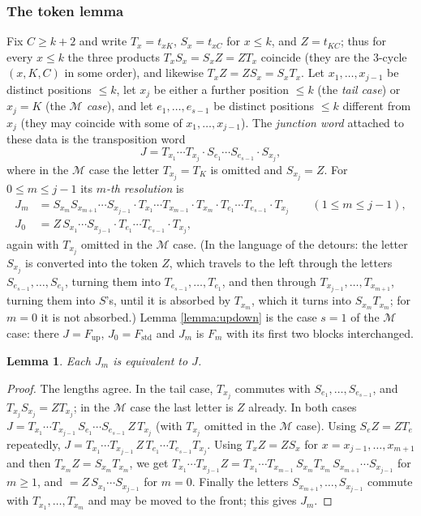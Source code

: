\documentclass{amsart}
\newtheorem{lemma}{Lemma}[section]
\theoremstyle{definition}
\theoremstyle{remark}
\numberwithin{equation}{section}
\begin{document}
\subsubsection*{The token lemma}
Fix $C\geq k+2$ and write $T_x=t_{xK}$, $S_x=t_{xC}$ for $x\leq k$, and $Z=t_{KC}$; thus for every $x\leq k$ the three products $T_xS_x=S_xZ=ZT_x$ coincide (they are the $3$-cycle $(x,K,C)$ in some order), and likewise $T_xZ=ZS_x=S_xT_x$. Let $x_1,\ldots,x_{j-1}$ be distinct positions $\leq k$, let $x_j$ be either a further position $\leq k$ (the \emph{tail case}) or $x_j=K$ (the \emph{$\mathcal M$ case}), and let $e_1,\ldots,e_{s-1}$ be distinct positions $\leq k$ different from $x_j$ (they may coincide with some of $x_1,\ldots,x_{j-1}$). The \emph{junction word} attached to these data is the transposition word
$$J=T_{x_1}\cdots T_{x_j}\cdot S_{e_1}\cdots S_{e_{s-1}}\cdot S_{x_j},$$
where in the $\mathcal M$ case the letter $T_{x_j}=T_K$ is omitted and $S_{x_j}=Z$. For $0\leq m\leq j-1$ its \emph{$m$-th resolution} is
\begin{align*}
J_m&=S_{x_m}S_{x_{m+1}}\cdots S_{x_{j-1}}\cdot T_{x_1}\cdots T_{x_{m-1}}\cdot T_{x_m}\cdot T_{e_1}\cdots T_{e_{s-1}}\cdot T_{x_j}\qquad(1\leq m\leq j-1),\\
J_0&=Z\,S_{x_1}\cdots S_{x_{j-1}}\cdot T_{e_1}\cdots T_{e_{s-1}}\cdot T_{x_j},
\end{align*}
again with $T_{x_j}$ omitted in the $\mathcal M$ case. (In the language of the detours: the letter $S_{x_j}$ is converted into the token $Z$, which travels to the left through the letters $S_{e_{s-1}},\ldots,S_{e_1}$, turning them into $T_{e_{s-1}},\ldots,T_{e_1}$, and then through $T_{x_{j-1}},\ldots,T_{x_{m+1}}$, turning them into $S$'s, until it is absorbed by $T_{x_m}$, which it turns into $S_{x_m}T_{x_m}$; for $m=0$ it is not absorbed.) Lemma \ref{lemma:updown} is the case $s=1$ of the $\mathcal M$ case: there $J=F_{\mathrm{up}}$, $J_0=F_{\mathrm{std}}$ and $J_m$ is $F_m$ with its first two blocks interchanged.

\begin{lemma} \label{lemma:resolutionproduct}
Each $J_m$ is equivalent to $J$.
\end{lemma}
\begin{proof}
The lengths agree. In the tail case, $T_{x_j}$ commutes with $S_{e_1},\ldots,S_{e_{s-1}}$, and $T_{x_j}S_{x_j}=ZT_{x_j}$; in the $\mathcal M$ case the last letter is $Z$ already. In both cases $J=T_{x_1}\cdots T_{x_{j-1}}\,S_{e_1}\cdots S_{e_{s-1}}\,Z\,T_{x_j}$ (with $T_{x_j}$ omitted in the $\mathcal M$ case). Using $S_eZ=ZT_e$ repeatedly, $J=T_{x_1}\cdots T_{x_{j-1}}\,Z\,T_{e_1}\cdots T_{e_{s-1}}T_{x_j}$. Using $T_xZ=ZS_x$ for $x=x_{j-1},\ldots,x_{m+1}$ and then $T_{x_m}Z=S_{x_m}T_{x_m}$, we get $T_{x_1}\cdots T_{x_{j-1}}Z=T_{x_1}\cdots T_{x_{m-1}}\,S_{x_m}T_{x_m}\,S_{x_{m+1}}\cdots S_{x_{j-1}}$ for $m\geq1$, and $=Z\,S_{x_1}\cdots S_{x_{j-1}}$ for $m=0$. Finally the letters $S_{x_{m+1}},\ldots,S_{x_{j-1}}$ commute with $T_{x_1},\ldots,T_{x_m}$ and may be moved to the front; this gives $J_m$.
\end{proof}
\end{document}
